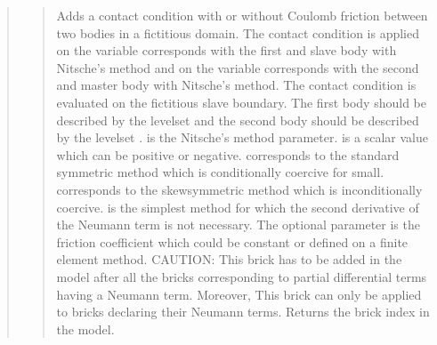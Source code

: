 \documentclass[a4paper,11pt,english]{sphinxmanual}
\begin{document}
\begin{quote}
\begin{quote}
Adds a contact condition with or without Coulomb friction between
two bodies in a fictitious domain. The contact condition is applied on
the variable  corresponds with the first and slave body
with Nitsche’s method and on the variable  corresponds
with the second and master body with Nitsche’s method.
The contact condition is evaluated on the fictitious slave boundary.
The first body should be described by the level\sphinxhyphen{}set 
and the second body should be described by the level\sphinxhyphen{}set .
 is the Nitsche’s method parameter.
 is a scalar value which can be positive or negative.
 corresponds to the standard symmetric method which is
conditionally coercive for   small.
 corresponds to the skew\sphinxhyphen{}symmetric method which is inconditionally coercive.
 is the simplest method for which the second derivative of
the Neumann term is not necessary. The optional parameter 
is the friction coefficient which could be constant or defined on a finite element method.
CAUTION: This brick has to be added in the model after all the bricks
corresponding to partial differential terms having a Neumann term.
Moreover, This brick can only be applied to bricks declaring their
Neumann terms. Returns the brick index in the model.
\end{quote}

\begin{quote}


\end{quote}
\end{quote}
\end{document}
